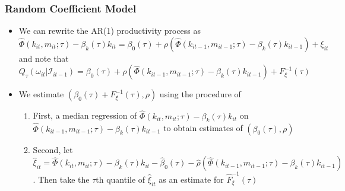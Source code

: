\documentclass{beamer}
\begin{document}

\begin{frame}
\frametitle{Random Coefficient Model}
\begin{itemize}
	\item We can rewrite the AR(1) productivity process as
		\begin{equation}
		\hat{\Phi}(k_{it}, m_{it}; \tau)-\beta_{k}(\tau)k_{it}=\beta_{0}(\tau)+\rho(\hat{\Phi}(k_{it-1}, m_{it-1}; \tau)-\beta_{k}(\tau)k_{it-1})+\xi_{it}
		\end{equation}
		and note that 
		\begin{equation}
		Q_{\tau}(\omega_{it}|\mathcal{I}_{it-1})=\beta_{0}(\tau)+\rho(\hat{\Phi}(k_{it-1}, m_{it-1}; \tau)-\beta_{k}(\tau)k_{it-1})+F_{\xi}^{-1}(\tau)
		\end{equation}
	\item We estimate $(\beta_{0}(\tau)+F_{\xi}^{-1}(\tau), \rho)$ using the procedure of \cite{He1997}
		\begin{enumerate}
			\item First, a median regression of $\hat{\Phi}(k_{it}, m_{it}; \tau)-\beta_{k}(\tau)k_{it}$ on $\hat{\Phi}(k_{it-1}, m_{it-1}; \tau)-\beta_{k}(\tau)k_{it-1}$ to obtain estimates of $(\beta_{0}(\tau), \rho)$
			\item Second, let $\hat{\xi}_{it}=\hat{\Phi}(k_{it}, m_{it}; \tau)-\beta_{k}(\tau)k_{it}-\hat{\beta}_{0}(\tau)-\hat{\rho}(\hat{\Phi}(k_{it-1}, m_{it-1}; \tau)-\beta_{k}(\tau)k_{it-1})$. Then take the $\tau$th quantile of $\hat{\xi}_{it}$ as an estimate for $\hat{F}_{\xi}^{-1}(\tau)$
		\end{enumerate}
\end{itemize}
\end{frame}

\end{document}
